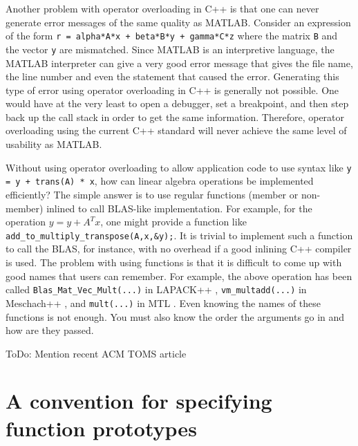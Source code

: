 \documentclass[acmtoms,acmnow]{acmtrans2m}
\begin{document}
Another problem with operator overloading in C++ is that one can never
generate error messages of the same quality as MATLAB.  Consider an expression
of the form {}\texttt{r = alpha*A*x + beta*B*y + gamma*C*z} where the matrix
{}\texttt{B} and the vector {}\texttt{y} are mismatched.  Since MATLAB is an
interpretive language, the MATLAB interpreter can give a very good error
message that gives the file name, the line number and even the statement that
caused the error.  Generating this type of error using operator overloading in
C++ is generally not possible.  One would have at the very least to open a
debugger, set a breakpoint, and then step back up the call stack in order to
get the same information.  Therefore, operator overloading using the current
C++ standard will never achieve the same level of usability as MATLAB.

Without using operator overloading to allow application code to use syntax
like {}\texttt{y = y + trans(A) * x}, how can linear algebra operations be
implemented efficiently?  The simple answer is to use regular functions
(member or non-member) inlined to call BLAS-like implementation.  For example,
for the operation $y = y + A^T x$, one might provide a function like
{}\texttt{add\_to\_multiply\_transpose(A,x,\&y);}.  It is trivial to implement
such a function to call the BLAS, for instance, with no overhead if a good
inlining C++ compiler is used.  The problem with using functions is that it is
difficult to come up with good names that users can remember.  For example,
the above operation has been called {}\texttt{Blas\_Mat\_Vec\_Mult(...)} in
LAPACK++ {}\cite{ref:pozo_1996}, {}\texttt{vm\_multadd(...)} in Meschach++
{}\cite{ref:roberts_et_al_1996}, and {}\texttt{mult(...)} in MTL
{}\cite{ref:lumsdaine_and_siek_1998}.  Even knowing the names of these
functions is not enough.  You must also know the order the arguments go in and
how are they passed.

ToDo: Mention recent ACM TOMS article 

\section{A convention for specifying function prototypes}
\end{document}
